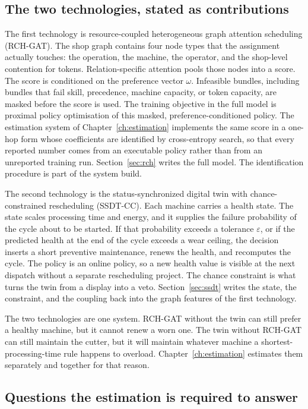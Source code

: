 \subsection{The two technologies, stated as contributions}

The first technology is resource-coupled heterogeneous graph attention scheduling (RCH-GAT). The shop graph contains four node types that the assignment actually touches: the operation, the machine, the operator, and the shop-level contention for tokens. Relation-specific attention pools those nodes into a score. The score is conditioned on the preference vector \(\omega\). Infeasible bundles, including bundles that fail skill, precedence, machine capacity, or token capacity, are masked before the score is used. The training objective in the full model is proximal policy optimisation of this masked, preference-conditioned policy. The estimation system of Chapter~\ref{ch:estimation} implements the same score in a one-hop form whose coefficients are identified by cross-entropy search, so that every reported number comes from an executable policy rather than from an unreported training run. Section~\ref{sec:rch} writes the full model. The identification procedure is part of the system build.

The second technology is the status-synchronized digital twin with chance-constrained rescheduling (SSDT-CC). Each machine carries a health state. The state scales processing time and energy, and it supplies the failure probability of the cycle about to be started. If that probability exceeds a tolerance \(\varepsilon\), or if the predicted health at the end of the cycle exceeds a wear ceiling, the decision inserts a short preventive maintenance, renews the health, and recomputes the cycle. The policy is an online policy, so a new health value is visible at the next dispatch without a separate rescheduling project. The chance constraint is what turns the twin from a display into a veto. Section~\ref{sec:ssdt} writes the state, the constraint, and the coupling back into the graph features of the first technology.

The two technologies are one system. RCH-GAT without the twin can still prefer a healthy machine, but it cannot renew a worn one. The twin without RCH-GAT can still maintain the cutter, but it will maintain whatever machine a shortest-processing-time rule happens to overload. Chapter~\ref{ch:estimation} estimates them separately and together for that reason.

\subsection{Questions the estimation is required to answer}

